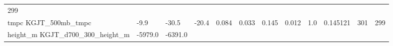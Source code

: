 \documentclass[11pt]{article}
\begin{document}
\begin{longtable}[]{@{}llllllllllll@{}}
\begin{minipage}[t]{0.07\columnwidth}
299\strut
\end{minipage}\tabularnewline
\begin{minipage}[t]{0.18\columnwidth}\raggedright\strut
tmpc KGJT\_500mb\_tmpc\strut
\end{minipage} & \begin{minipage}[t]{0.04\columnwidth}\raggedright\strut
-9.9\strut
\end{minipage} & \begin{minipage}[t]{0.04\columnwidth}\raggedright\strut
-30.5\strut
\end{minipage} & \begin{minipage}[t]{0.04\columnwidth}\raggedright\strut
-20.4\strut
\end{minipage} & \begin{minipage}[t]{0.04\columnwidth}\raggedright\strut
0.084\strut
\end{minipage} & \begin{minipage}[t]{0.05\columnwidth}\raggedright\strut
0.033\strut
\end{minipage} & \begin{minipage}[t]{0.04\columnwidth}\raggedright\strut
0.145\strut
\end{minipage} & \begin{minipage}[t]{0.04\columnwidth}\raggedright\strut
0.012\strut
\end{minipage} & \begin{minipage}[t]{0.05\columnwidth}\raggedright\strut
1.0\strut
\end{minipage} & \begin{minipage}[t]{0.05\columnwidth}\raggedright\strut
0.145121\strut
\end{minipage} & \begin{minipage}[t]{0.05\columnwidth}\raggedright\strut
301\strut
\end{minipage} & \begin{minipage}[t]{0.07\columnwidth}\raggedright\strut
299\strut
\end{minipage}\tabularnewline
\begin{minipage}[t]{0.18\columnwidth}\raggedright\strut
height\_m KGJT\_d700\_300\_height\_m\strut
\end{minipage} & \begin{minipage}[t]{0.04\columnwidth}\raggedright\strut
-5979.0\strut
\end{minipage} & \begin{minipage}[t]{0.04\columnwidth}\raggedright\strut
-6391.0\strut
\end{minipage} & \begin{minipage}[t]{0.04\columnwidth}\raggedright\strut

\end{minipage}
\end{longtable}
\end{document}
